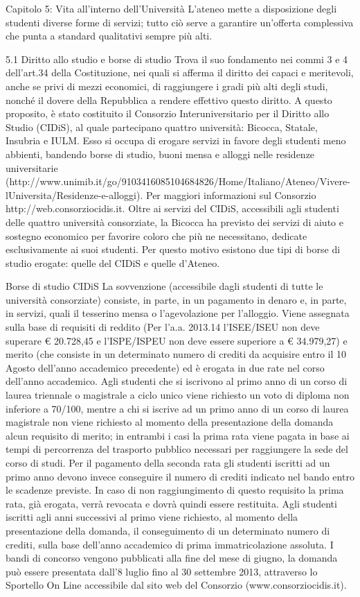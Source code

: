 Capitolo 5: Vita all'interno dell'Università
L'ateneo mette a disposizione degli studenti diverse forme di servizi; tutto ciò serve a garantire un'offerta complessiva che punta a standard qualitativi sempre più alti. 

5.1 Diritto allo studio e borse di studio
Trova il suo fondamento nei commi 3 e 4 dell'art.34 della Costituzione, nei quali si afferma il diritto dei capaci e meritevoli, anche se privi di mezzi economici, di raggiungere i gradi più alti degli studi, nonché il dovere della Repubblica a rendere effettivo questo diritto. 
A questo proposito, è stato costituito il Consorzio Interuniversitario per il Diritto allo Studio (CIDiS), al quale partecipano quattro università: Bicocca, Statale, Insubria e IULM.  Esso si occupa di erogare servizi in favore degli studenti meno abbienti, bandendo borse di studio, buoni mensa e alloggi nelle residenze universitarie (http://www.unimib.it/go/9103416085104684826/Home/Italiano/Ateneo/Vivere-lUniversita/Residenze-e-alloggi). Per maggiori informazioni sul Consorzio http://web.consorziocidis.it. 
Oltre ai servizi del CIDiS, accessibili agli studenti delle quattro università consorziate, la Bicocca ha previsto dei servizi di aiuto e sostegno economico per favorire coloro che più ne necessitano, dedicate esclusivamente ai suoi studenti. Per questo motivo esistono due tipi di borse di studio erogate: quelle del CIDiS e quelle d'Ateneo. 

Borse di studio CIDiS
La sovvenzione (accessibile dagli studenti di tutte le università consorziate) consiste, in parte, in un pagamento in denaro e, in parte, in servizi, quali il tesserino mensa o l'agevolazione per l'alloggio. Viene assegnata sulla base di requisiti di reddito (Per l'a.a. 2013.14 l'ISEE/ISEU non deve superare € 20.728,45 e l'ISPE/ISPEU non deve essere superiore a € 34.979,27) e merito (che consiste in un determinato numero di crediti da acquisire entro il 10 Agosto dell'anno accademico precedente) ed è erogata in due rate nel corso dell'anno accademico. Agli studenti che si iscrivono al primo anno di un corso di laurea triennale o magistrale a ciclo unico viene richiesto un voto di diploma non inferiore a 70/100, mentre a chi si iscrive ad un primo anno di un corso di laurea magistrale non viene richiesto al momento della presentazione della domanda alcun requisito di merito; in entrambi i casi la prima rata viene pagata in base ai tempi di percorrenza del trasporto pubblico necessari per raggiungere la sede del corso di studi.
Per il pagamento della seconda rata gli studenti iscritti ad un primo anno devono invece conseguire il numero di crediti indicato nel bando entro le scadenze previste. In caso di non raggiungimento di questo requisito la prima rata, già erogata, verrà revocata e dovrà quindi essere restituita. Agli studenti iscritti agli anni successivi al primo viene richiesto, al momento della presentazione della domanda, il conseguimento di un determinato numero di crediti, sulla base dell'anno accademico di prima immatricolazione assoluta.
I bandi di concorso vengono pubblicati alla fine del mese di giugno, la domanda può essere presentata dall'8 luglio fino al 30 settembre 2013, attraverso lo Sportello On Line accessibile dal sito web del Consorzio (www.consorziocidis.it).

